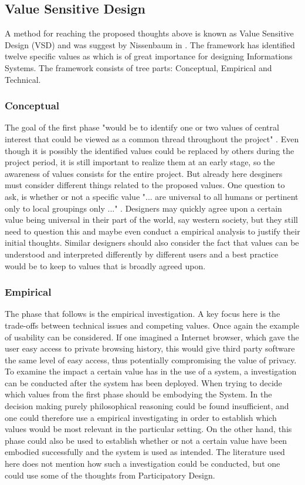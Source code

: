\subsection{Value Sensitive Design}
A method for reaching the proposed thoughts above is known as Value Sensitive Design (VSD) and was suggest by Nissenbaum in . The framework has identified twelve specific values as which is of great importance for designing Informations Systems. The framework consists of tree parts: Conceptual, Empirical and Technical.

\subsubsection{Conceptual}
The goal of the first phase "would be to identify one or two values of central interest that could be viewed as a common thread throughout the project" . Even though it is possibly the identified values could be replaced by others during the project period, it is still important to realize them at an early stage, so the awareness of values consists for the entire project. But already here desginers must consider different things related to the proposed values. One question to ask, is whether or not a specific value "... are universal to all humans or pertinent only to local groupings only ..." . Designers may quickly agree upon a certain value being universal in their part of the world, say western society, but they still need to question this and maybe even conduct a empirical analysis to justify their initial thoughts. Similar designers should also consider the fact that values can be understood and interpreted differently by different users and a best practice would be to keep to values that is broadly agreed upon. 

\subsubsection{Empirical}
The phase that follows is the empirical investigation. A key focus here is the trade-offs between technical issues and competing values. Once again the example of usability can be considered. If one imagined a Internet browser, which gave the user easy access to private browsing history, this would give third party software the same level of easy access, thus potentially compromising the value of privacy. To examine the impact a certain value has in the use of a system, a investigation can be conducted after the system has been deployed. When trying to decide which values from the first phase should be embodying the System. In the decision making purely philosophical reasoning could be found insufficient, and one could therefore use a empirical investigating in order to establish which values would be most relevant in the particular setting. On the other hand, this phase could also be used to establish whether or not a certain  value have been embodied successfully and the system is used as intended. The literature used here does not mention how such a investigation could be conducted, but one could use some of the thoughts from Participatory Design. 

